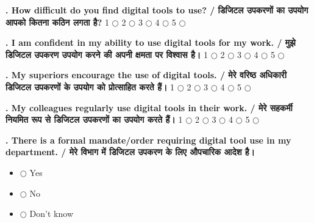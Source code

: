 \documentclass[11pt,a4paper]{article}
\newcounter{qcounter}
\begin{document}
\textbf{. How difficult do you find digital tools to use? / डिजिटल उपकरणों का उपयोग आपको कितना कठिन लगता है?}
\vspace{0.1cm}
\vspace{0.1cm}
1 $\bigcirc$ \hspace{1cm} 2 $\bigcirc$ \hspace{1cm} 3 $\bigcirc$ \hspace{1cm} 4 $\bigcirc$ \hspace{1cm} 5 $\bigcirc$
\vspace{0.4cm}

\textbf{. I am confident in my ability to use digital tools for my work. / मुझे डिजिटल उपकरण उपयोग करने की अपनी क्षमता पर विश्वास है।}
\vspace{0.1cm}
\vspace{0.1cm}
1 $\bigcirc$ \hspace{1cm} 2 $\bigcirc$ \hspace{1cm} 3 $\bigcirc$ \hspace{1cm} 4 $\bigcirc$ \hspace{1cm} 5 $\bigcirc$
\vspace{0.4cm}

\textbf{. My superiors encourage the use of digital tools. / मेरे वरिष्ठ अधिकारी डिजिटल उपकरणों के उपयोग को प्रोत्साहित करते हैं।}
\vspace{0.1cm}
\vspace{0.1cm}
1 $\bigcirc$ \hspace{1cm} 2 $\bigcirc$ \hspace{1cm} 3 $\bigcirc$ \hspace{1cm} 4 $\bigcirc$ \hspace{1cm} 5 $\bigcirc$
\vspace{0.4cm}

\textbf{. My colleagues regularly use digital tools in their work. / मेरे सहकर्मी नियमित रूप से डिजिटल उपकरणों का उपयोग करते हैं।}
\vspace{0.1cm}
\vspace{0.1cm}
1 $\bigcirc$ \hspace{1cm} 2 $\bigcirc$ \hspace{1cm} 3 $\bigcirc$ \hspace{1cm} 4 $\bigcirc$ \hspace{1cm} 5 $\bigcirc$
\vspace{0.4cm}

\textbf{. There is a formal mandate/order requiring digital tool use in my department. / मेरे विभाग में डिजिटल उपकरण के लिए औपचारिक आदेश है।}
\vspace{0.1cm}
\begin{itemize}[label=, itemsep=0.1cm, leftmargin=0.5cm]
    \item $\bigcirc$ Yes
    \item $\bigcirc$ No
    \item $\bigcirc$ Don't know
\end{itemize}
\vspace{0.2cm}
\end{document}
